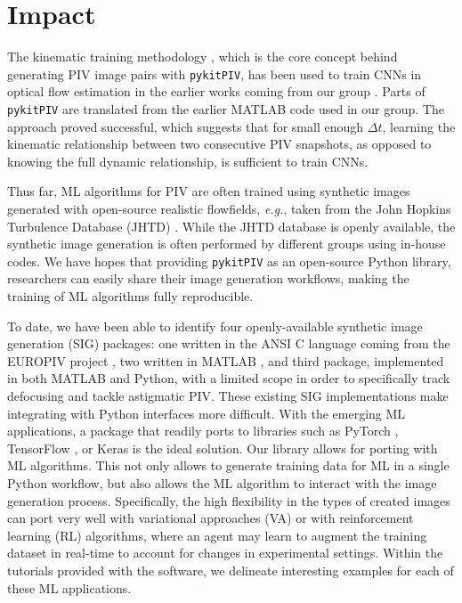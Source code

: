 \documentclass[a4paper,fleqn]{cas-dc}
\begin{document}
\section{Impact} \label{sec:results}

The kinematic training methodology \cite{manickathan2022kinematic}, which is the core concept behind generating PIV image pairs with \texttt{pykitPIV}, has been used to train CNNs in optical flow estimation in the earlier works coming from our group \cite{manickathan2022kinematic, manickathan2023lightweight, mucignat2023lightweight}. 
Parts of \texttt{pykitPIV} are translated from the earlier MATLAB code used in our group.
The approach proved successful, which suggests that for small enough $\Delta t$, learning the kinematic relationship between two consecutive PIV snapshots, as opposed to knowing the full dynamic relationship, is sufficient to train CNNs.

Thus far, ML algorithms for PIV are often trained using synthetic images generated with open-source realistic flowfields, \textit{e.g.}, taken from the John Hopkins Turbulence Database (JHTD) \cite{perlman2007data}. While the JHTD database is openly available, the synthetic image generation is often performed by different groups using in-house codes. We have hopes that providing \texttt{pykitPIV} as an open-source Python library, researchers can easily share their image generation workflows, making the training of ML algorithms fully reproducible.

\cite{mucignat2024respiratory}

To date, we have been able to identify four openly-available synthetic image generation (SIG) packages: one written in the ANSI C language coming from the EUROPIV project \cite{lecordier2004europiv}, two written in MATLAB \citep{ben2020openpiv, mendes2020piv}, and third package, implemented in both MATLAB and Python, with a limited scope in order to specifically track defocusing and tackle astigmatic PIV. These existing SIG implementations make integrating with Python interfaces more difficult. With the emerging ML applications, a package that readily ports to libraries such as PyTorch \cite{paszke2017automatic, paszke2019pytorch}, TensorFlow \cite{tensorflow2015}, or Keras \cite{chollet2015keras} is the ideal solution. Our library allows for porting with ML algorithms. This not only allows to generate training data for ML in a single Python workflow, but also allows the ML algorithm to interact with the image generation process. Specifically, the high flexibility in the types of created images can port very well with variational approaches (VA) or with reinforcement learning (RL) algorithms, where an agent may learn to augment the training dataset in real-time to account for changes in experimental settings. Within the tutorials provided with the software, we delineate interesting examples for each of these ML applications.
\end{document}
